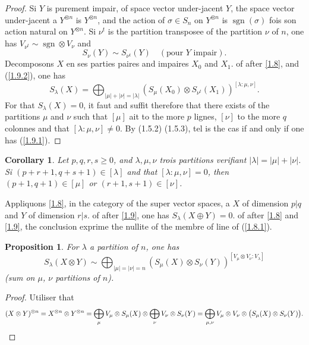 \documentclass[11pt,a4paper]{article}
\theoremstyle{plain}
\newtheorem{proposition}[theorem]{Proposition}
\newtheorem{corollary}[theorem]{Corollary}
\theoremstyle{definition}
\DeclareMathOperator{\sgn}{sgn}
\begin{document}
\begin{proof}
Si $Y$ is purement impair, of space vector under-jacent $Y$, the space vector under-jacent a $Y^{\otimes n}$ is $Y^{\otimes n}$, and the action of $\sigma\in S_n$ on $Y^{\otimes n}$ is $\sgn(\sigma)$ fois son action natural on $Y^{\otimes n}$. Si $\nu^t$ is the partition transposee of the partition $\nu$ of $n$, one has $V_{\nu^t}\sim\sgn\otimes V_\nu$ and
\begin{equation}\label{1.9.2}
S_\nu(Y)\sim S_{\nu^t}(Y)\quad(\text{pour }Y\text{ impair}).
\end{equation}
Decomposons $X$ en ses parties paires and impaires $X_0$ and $X_1$. of after \ref{1.8}, and (\ref{1.9.2}), one has
\[
S_\lambda(X)=\bigoplus_{|\mu|+|\nu|=|\lambda|}(S_\mu(X_0)\otimes S_{\nu^t}(X_1))^{[\lambda:\mu,\nu]}.
\]
For that $S_\lambda(X)=0$, it faut and suffit therefore that there exists of the partitions $\mu$ and $\nu$ such that $[\mu]$ ait to the more $p$ lignes, $[\nu]$ to the more $q$ colonnes and that $[\lambda:\mu,\nu]\neq0$. By (1.5.2) (1.5.3), tel is the cas if and only if one has (\ref{1.9.1}).
\end{proof}

\begin{corollary}\label{1.10}
Let $p,q,r,s\geq0$, and $\lambda,\mu,\nu$ trois partitions verifiant $|\lambda|=|\mu|+|\nu|$. Si $(p+r+1,q+s+1)\in[\lambda]$ and that $[\lambda:\mu,\nu]=0$, then $(p+1,q+1)\in[\mu]$ or $(r+1,s+1)\in[\nu]$.
\end{corollary}

Appliquons \ref{1.8}, in the category of the super vector spaces, a $X$ of dimension $p|q$ and $Y$ of dimension $r|s$. of after \ref{1.9}, one has $S_\lambda(X\oplus Y)=0$. of after \ref{1.8} and \ref{1.9}, the conclusion exprime the nullite of the membre of line of (\ref{1.8.1}).

\begin{proposition}\label{1.11}
For $\lambda$ a partition of $n$, one has
\begin{equation}\label{1.11.1}
S_\lambda(X\otimes Y)\sim\bigoplus_{|\mu|=|\nu|=n}(S_\mu(X)\otimes S_\nu(Y))^{[V_\mu\otimes V_\nu:V_\lambda]}
\end{equation}
(sum on $\mu$, $\nu$ partitions of $n$).
\end{proposition}

\begin{proof}
Utiliser that
\[
(X\otimes Y)^{\otimes n}=X^{\otimes n}\otimes Y^{\otimes n}=\bigoplus_\mu V_\mu\otimes S_\mu(X)\otimes\bigoplus_\nu V_\nu\otimes S_\nu(Y)=\bigoplus_{\mu,\nu}V_\mu\otimes V_\nu\otimes\bigl(S_\mu(X)\otimes S_\nu(Y)\bigr).\qedhere
\]
\end{proof}
\end{document}
